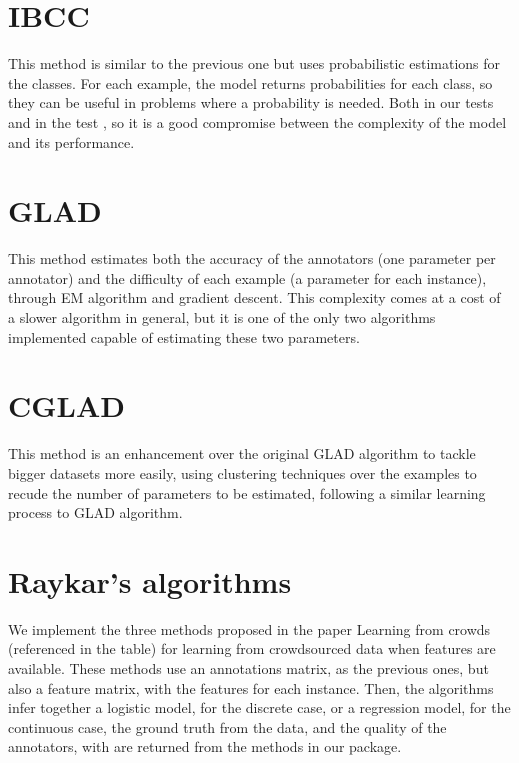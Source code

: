 \documentclass[letterpaper,10pt,english]{sphinxmanual}
\begin{document}
\section{IBCC}
\label{\detokenize{package/methods:id4}}
This method is similar to the previous one but uses probabilistic estimations for the classes. For each example,
the model returns probabilities for each class, so they can be useful in problems where a probability is needed.
Both in our tests and in the test , so it is
a good compromise between the complexity of the model and its performance.


\section{GLAD}
\label{\detokenize{package/methods:id5}}
This method estimates both the accuracy of the annotators (one parameter per annotator) and the difficulty
of each example (a parameter for each instance), through EM algorithm and gradient descent. This complexity
comes at a cost of a slower algorithm in general, but it is one of the only two algorithms implemented capable of estimating these two parameters.


\section{CGLAD}
\label{\detokenize{package/methods:id6}}
This method is an enhancement over the original GLAD algorithm to tackle bigger datasets more easily, using
clustering techniques over the examples to recude the number of parameters to be estimated, following a similar
learning process to GLAD algorithm.


\section{Raykar’s algorithms}
\label{\detokenize{package/methods:raykar-s-algorithms}}
We implement the three methods proposed in the paper Learning from crowds (referenced in the table) for learning
from crowdsourced data when features are available. These methods use an annotations matrix, as the previous ones,
but also a feature matrix, with the features for each instance. Then, the algorithms infer together a logistic
model, for the discrete case, or a regression model, for the continuous case, the ground truth from the data,
and the quality of the annotators, with are returned from the methods in our package.
\end{document}
